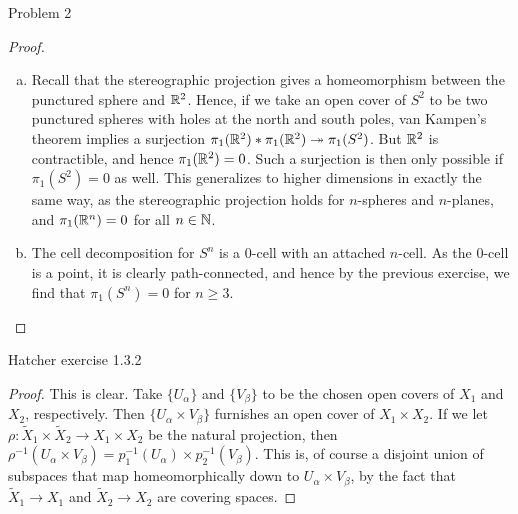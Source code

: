 \documentclass{../../mathnotes}
\begin{document}
\begin{prop}
    Problem 2
\end{prop}
\begin{proof}
    \hfill
    \begin{enumerate}[(a)]
        \item Recall that the stereographic projection gives a homeomorphism between
            the punctured sphere and $\mathbb{R}^2$. Hence, if we take an open cover of $S^2$
            to be two punctured spheres with holes at the north and south poles, van
            Kampen's theorem implies a surjection $\pi_1(\mathbb{R}^2)*\pi_1(\mathbb{R}^2)\twoheadrightarrow\pi_1(S^2)$.
            But $\mathbb{R}^2$ is contractible, and hence $\pi_1(\mathbb{R}^2)=0$. Such a surjection
            is then only possible if $\pi_1(S^2)=0$ as well. This generalizes to higher
            dimensions in exactly the same way, as the stereographic projection holds
            for $n$-spheres and $n$-planes, and $\pi_1(\mathbb{R}^n)=0$ for all $n\in\mathbb{N}$.
        \item The cell decomposition for $S^n$ is a 0-cell with an attached $n$-cell.
            As the 0-cell is a point, it is clearly path-connected, and hence by the
            previous exercise, we find that $\pi_1(S^n)=0$ for $n\geq 3$.
    \end{enumerate}
\end{proof}

\begin{prop}
    Hatcher exercise 1.3.2
\end{prop}
\begin{proof}
    This is clear. Take $\{U_\alpha\}$ and $\{V_\beta\}$ to be the chosen open covers of
    $X_1$ and $X_2$, respectively. Then $\{U_\alpha\times V_\beta\}$ furnishes an open cover of
    $X_1\times X_2$. If we let $\rho:\tilde X_1\times\tilde X_2\to X_1\times X_2$ be the
    natural projection, then $\rho^{-1}(U_\alpha\times V_\beta)=p_1^{-1}(U_\alpha)\times p_2^{-1}(V_\beta)$.
    This is, of course a disjoint union of subspaces that map homeomorphically down to
    $U_\alpha\times V_\beta$, by the fact that $\tilde X_1\to X_1$ and $\tilde X_2\to X_2$
    are covering spaces.
\end{proof}
\end{document}
